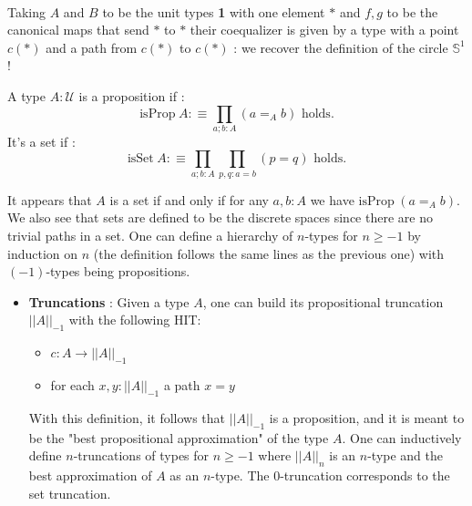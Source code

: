 \documentclass{report}
\begin{document}
\begin{itemize}
  \hfill 
  \begin{minipage}{.5\textwidth} 
    \begin{center}
      \label{fig:coequalizer}
    \end{center}
  \end{minipage}
  \\
  Taking $A$ and $B$ to be the unit types \textbf{1} with one element $*$ and $f,g$ to be the canonical maps that send $*$ to $*$ their coequalizer is given by a type with a point $c(*)$ and a path from $c(*)$ to $c(*)$ : we recover the definition of the circle $\mathbb{S}^1$ !
\end{itemize}
\begin{mydef}
  A type $A : \mathcal{U}$ is a proposition if : 
  $$\mathrm{isProp}\hspace{3pt} A :\equiv \prod_{a;b : A} (a=_A b)\text{  holds.}$$
  It's a set if :
  $$\mathrm{isSet}\hspace{3pt}A :\equiv \prod_{a;b : A} \prod_{p,q : a=b} (p= q)\text{  holds.}$$ 
\end{mydef}
It appears that $A$ is a set if and only if for any $a,b :A$ we have $\mathrm{isProp}\hspace{3pt} (a=_A b)$. We also see that sets are defined to be the discrete spaces since there are no trivial paths in a set. One can define a hierarchy of $n$-types for $n\geq -1$ by induction on $n$ (the definition follows the same lines as the previous one) with $(-1)$-types being propositions.
\begin{itemize}
  \item \textbf{Truncations} : Given a type $A$, one can build its propositional truncation $||A||_{-1}$ with the following HIT:
    \begin{itemize}
      \item $c : A \rightarrow ||A||_{-1}$
      \item for each $x,y : ||A||_{-1}$ a path $x=y$
    \end{itemize}
    With this definition, it follows that $||A||_{-1}$ is a proposition, and it is meant to be the "best propositional approximation" of the type $A$. One can inductively define $n$-truncations of types for $n \geq -1$ where $||A||_{n}$ is an $n$-type and the best approximation of $A$ as an $n$-type. The $0$-truncation corresponds to the set truncation. 
\end{itemize} 
\end{document}
